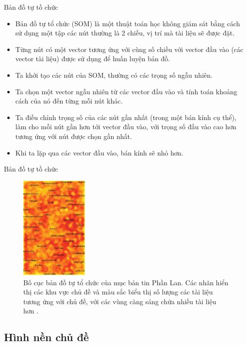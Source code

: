 \documentclass[10pt]{beamer}
\theoremstyle{remark}
\theoremstyle{definition}
\begin{document}
\begin{frame}{Bản đồ tự tồ chức}
	\begin{itemize}
		\item Bản đồ tự tổ chức (SOM) \cite{248} là một thuật toán học không giám sát bằng cách sử dụng một tập các nút thường là 2 chiều, vị trí mà tài liệu sẽ được đặt.
		\item Từng nút có một vector tương ứng với cùng số chiều với vector đầu vào (các vector tài liệu) được sử dụng để huấn luyện bản đồ.
		\item Ta khởi tạo các nút của SOM, thường có các trọng số ngẫu nhiên.
		\item Ta chọn một vector ngẫu nhiên từ các vector đầu vào và tính toán khoảng cách của nó đến từng mỗi nút khác.
		\item Ta điều chỉnh trọng số của các nút gần nhất (trong một bán kính cụ thể), làm cho mỗi nút gần hơn tới vector đầu vào,
		với trọng số đầu vào cao hơn tương ứng với nút được chọn gần nhất.
		\item Khi ta lặp qua các vector đầu vào, bán kính sẽ nhỏ hơn.
	\end{itemize}
\end{frame}

\begin{frame}{Bản đồ tự tồ chức}
	\begin{figure}[h!]
        \centering
        \includegraphics[width=0.3\textwidth]{10.png}
        \caption{Bố cục bản đồ tự tổ chức của mục bản tin Phần Lan.
        Các nhãn hiển thị các khu vực chủ đề và màu sắc biểu thị số lượng các tài liệu tương ứng với chủ đề, với các vùng càng sáng chứa nhiều tài liệu hơn \cite{454}.}
        \label{fig:10}
    \end{figure}
\end{frame}

\subsection{Hình nền chủ đề}
\end{document}
